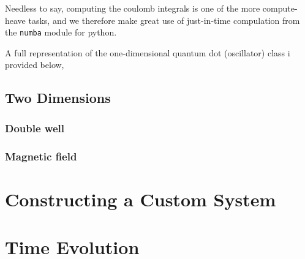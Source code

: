 Needless to say, computing the coulomb integrals is one of the more compute-heave tasks,
and we therefore make great use of just-in-time compulation from the \lstinline{numba} 
module for python.

A full representation of the one-dimensional quantum dot (oscillator) class i provided 
below,


\subsection{Two Dimensions}

\subsubsection{Double well}

\subsubsection{Magnetic field}

\section{Constructing a Custom System}

\section{Time Evolution}

